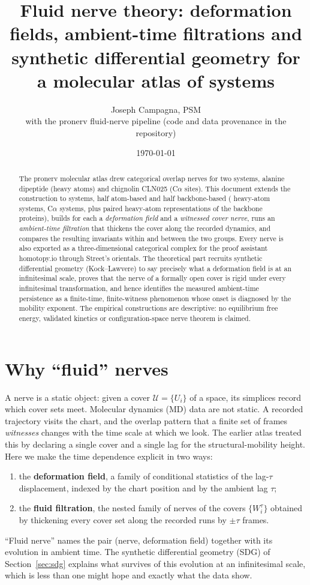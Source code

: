 \documentclass[11pt]{article}
\title{Fluid nerve theory: deformation fields, ambient-time filtrations and\\synthetic differential geometry for a molecular atlas of \nSystems{} systems}
\author{Joseph Campagna, PSM\\[2pt]\small with the pronerv fluid-nerve pipeline (code and data provenance in the repository)}
\date{\today}
\newcommand{\U}{\mathcal{U}}
\begin{document}
\maketitle

\begin{abstract}
The pronerv molecular atlas drew categorical overlap nerves for two systems, alanine dipeptide (heavy atoms) and chignolin CLN025 (C$\alpha$ sites). This document extends the construction to \nSystems{} systems, half atom-based and half backbone-based (\nAtom{} heavy-atom systems, \nBackbone{} C$\alpha$ systems, plus \nPaired{} paired heavy-atom representations of the backbone proteins), builds for each a \emph{deformation field} and a \emph{witnessed cover nerve}, runs an \emph{ambient-time filtration} that thickens the cover along the recorded dynamics, and compares the resulting invariants within and between the two groups. Every nerve is also exported as a three-dimensional categorical complex for the proof assistant homotopy.io through Street's orientals. The theoretical part recruits synthetic differential geometry (Kock--Lawvere) to say precisely what a deformation field is at an infinitesimal scale, proves that the nerve of a formally open cover is rigid under every infinitesimal transformation, and hence identifies the measured ambient-time persistence as a finite-time, finite-witness phenomenon whose onset is diagnosed by the mobility exponent. The empirical constructions are descriptive: no equilibrium free energy, validated kinetics or configuration-space nerve theorem is claimed.
\end{abstract}

\tableofcontents

\section{Why ``fluid'' nerves}
A nerve is a static object: given a cover $\U=\{U_i\}$ of a space, its simplices record which cover sets meet. Molecular dynamics (MD) data are not static. A recorded trajectory visits the chart, and the overlap pattern that a finite set of frames \emph{witnesses} changes with the time scale at which we look. The earlier atlas treated this by declaring a single cover and a single lag for the structural-mobility height. Here we make the time dependence explicit in two ways:
\begin{enumerate}[nosep]
\item the \textbf{deformation field}, a family of conditional statistics of the lag-$\tau$ displacement, indexed by the chart position and by the ambient lag $\tau$;
\item the \textbf{fluid filtration}, the nested family of nerves of the covers $\{W_i^{\tau}\}$ obtained by thickening every cover set along the recorded runs by $\pm\tau$ frames.
\end{enumerate}
``Fluid nerve'' names the pair (nerve, deformation field) together with its evolution in ambient time. The synthetic differential geometry (SDG) of Section~\ref{sec:sdg} explains what survives of this evolution at an infinitesimal scale, which is less than one might hope and exactly what the data show.
\end{document}
